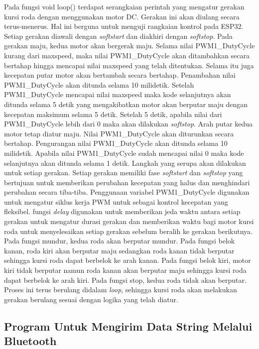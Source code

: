 Pada fungsi void loop() terdapat serangkaian perintah yang mengatur gerakan kursi roda dengan menggunakan motor DC. Gerakan ini akan diulang secara terus-menerus. Hal ini berguna untuk menguji rangkaian kontrol pada ESP32. Setiap gerakan diawali dengan \emph{softstart} dan diakhiri dengan \emph{softstop}. Pada gerakan maju, kedua motor akan bergerak maju. Selama nilai PWM1\_DutyCycle kurang dari maxspeed, maka nilai PWM1\_DutyCycle akan ditambahkan secara bertahap hingga mencapai nilai maxspeed yang telah ditentukan. Selama itu juga kecepatan putar motor akan bertambah secara bertahap. Penambahan nilai PWM1\_DutyCycle akan ditunda selama 10 milidetik. Setelah PWM1\_DutyCycle mencapai nilai maxspeed maka kode selanjutnya akan ditunda selama 5 detik yang mengakibatkan motor akan berputar maju dengan kecepatan maksimum selama 5 detik. Setelah 5 detik, apabila nilai dari PWM1\_DutyCycle lebih dari 0 maka akan dilakukan \emph{softstop}. Arah putar kedua motor tetap diatur maju. Nilai PWM1\_DutyCycle akan diturunkan secara bertahap. Pengurangan nilai PWM1\_DutyCycle akan ditunda selama 10 milidetik. Apabila nilai PWM1\_DutyCycle sudah mencapai nilai 0 maka kode selanjutnya akan ditunda selama 1 detik. Langkah yang serupa akan dilakukan untuk setiap gerakan. Setiap gerakan memiliki fase \emph{softstart} dan \emph{softstop} yang bertujuan untuk memberikan perubahan kecepatan yang halus dan menghindari perubahan secara tiba-tiba. Penggunaan variabel PWM1\_DutyCycle digunakan untuk mengatur siklus kerja PWM untuk sebagai kontrol kecepatan yang fleksibel. fungsi \emph{delay} digunakan untuk memberikan jeda waktu antara setiap gerakan untuk mengatur durasi gerakan dan memberikan waktu bagi motor kursi roda untuk menyelesaikan setiap gerakan sebelum beralih ke gerakan berikutnya. Pada fungsi mundur, kedua roda akan berputar mundur. Pada fungsi belok kanan, roda kiri akan berputar maju sedangkan roda kanan tidak berputar sehingga kursi roda dapat berbelok ke arah kanan. Pada fungsi belok kiri, motor kiri tidak berputar namun roda kanan akan berputar maju sehingga kursi roda dapat berbelok ke arah kiri. Pada fungsi stop, kedua roda tidak akan berputar. Proses ini terus berulang didalam \emph{loop}, sehingga kursi roda akan melakukan gerakan berulang sesuai dengan logika yang telah diatur.


\subsection{Program Untuk Mengirim Data String Melalui Bluetooth}

